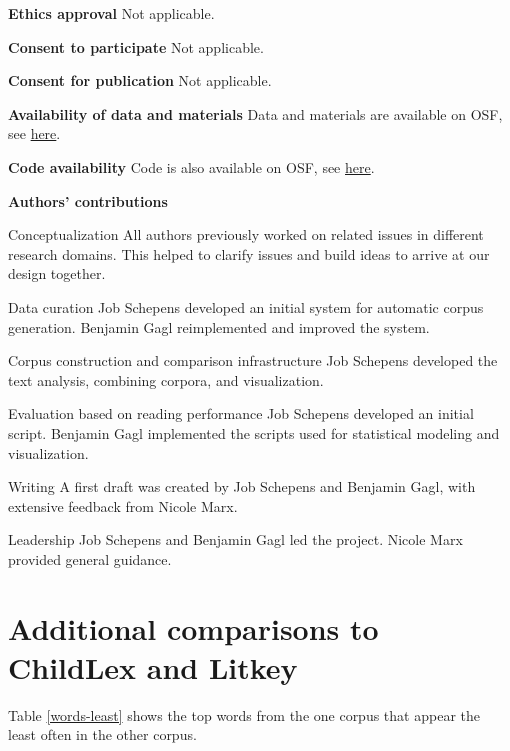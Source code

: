 \documentclass[jou, a4paper]{apa7}
\begin{document}
\textbf{Ethics approval} Not applicable. 

\textbf{Consent to participate} Not applicable. 

\textbf{Consent for publication} Not applicable. 

\textbf{Availability of data and materials} Data and materials are available on OSF, see \href{www.osf.com}{here}.

\textbf{Code availability} Code is also available on OSF, see \href{www.osf.com}{here}.

\textbf{Authors' contributions} 

Conceptualization
All authors previously worked on related issues in different research domains. This helped to clarify issues and build ideas to arrive at our design together. 

Data curation
Job Schepens developed an initial system for automatic corpus generation. Benjamin Gagl reimplemented and improved the system. 

Corpus construction and comparison infrastructure 
Job Schepens developed the text analysis, combining corpora, and visualization. 

Evaluation based on reading performance
Job Schepens developed an initial script. Benjamin Gagl implemented the scripts used for statistical modeling and visualization. 

Writing 
A first draft was created by Job Schepens and Benjamin Gagl, with extensive feedback from Nicole Marx. 

Leadership 
Job Schepens and Benjamin Gagl led the project. Nicole Marx provided general guidance. 


\newpage
 

\newpage

\appendix

\section{Additional comparisons to ChildLex and Litkey}

Table \ref{words-least} shows the top words from the one corpus that appear the least often in the other corpus. 
\end{document}
